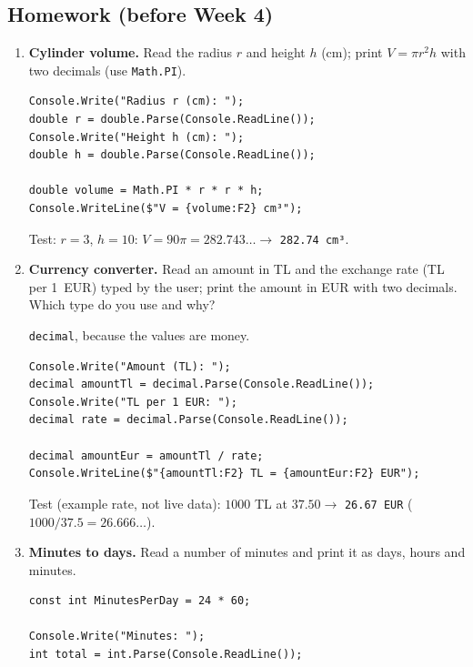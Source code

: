 \subsection{Homework (before Week 4)}
\begin{enumerate}[label=\textbf{H\arabic*.},leftmargin=*,itemsep=1pt]
  \item {} \textbf{Cylinder volume.} Read the radius $r$ and height $h$ (cm); print $V = \pi r^2 h$ with two decimals (use \texttt{Math.PI}).
  \ifsolutions\begin{solbox}\begin{lstlisting}[numbers=none]
Console.Write("Radius r (cm): ");
double r = double.Parse(Console.ReadLine());
Console.Write("Height h (cm): ");
double h = double.Parse(Console.ReadLine());

double volume = Math.PI * r * r * h;
Console.WriteLine($"V = {volume:F2} cm³");
\end{lstlisting}
 Test: $r=3$, $h=10$: $V = 90\pi = 282.743\ldots \to$ \texttt{282.74 cm³}.
\end{solbox}\fi
  \item {} \textbf{Currency converter.} Read an amount in TL and the exchange rate (TL per 1~EUR) typed by the user; print the amount in EUR with two decimals. Which type do you use and why?
  \ifsolutions\begin{solbox}\texttt{decimal}, because the values are money.
\begin{lstlisting}[numbers=none]
Console.Write("Amount (TL): ");
decimal amountTl = decimal.Parse(Console.ReadLine());
Console.Write("TL per 1 EUR: ");
decimal rate = decimal.Parse(Console.ReadLine());

decimal amountEur = amountTl / rate;
Console.WriteLine($"{amountTl:F2} TL = {amountEur:F2} EUR");
\end{lstlisting}
 Test (example rate, not live data): $1000$ TL at $37.50 \to$ \texttt{26.67 EUR} ($1000/37.5 = 26.666\ldots$).
\end{solbox}\fi
  \item {} \textbf{Minutes to days.} Read a number of minutes and print it as days, hours and minutes.
  \ifsolutions\begin{solbox}\begin{lstlisting}[numbers=none]
const int MinutesPerDay = 24 * 60;

Console.Write("Minutes: ");
int total = int.Parse(Console.ReadLine());


\end{lstlisting}
\end{solbox}
\end{enumerate}
